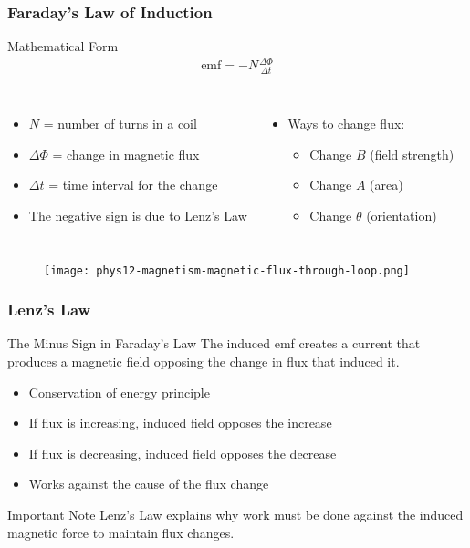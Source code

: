 \documentclass{beamer}
\begin{document}
\begin{frame}
\frametitle{Faraday's Law of Induction}
\begin{block}{Mathematical Form}
\begin{align}
\text{emf} = -N\frac{\Delta\Phi}{\Delta t}
\end{align}
\end{block}

\begin{columns}
\begin{itemize}
\item $N$ = number of turns in a coil
\item $\Delta\Phi$ = change in magnetic flux
\item $\Delta t$ = time interval for the change
\item The negative sign is due to Lenz's Law
\end{itemize}

\begin{itemize}
\item Ways to change flux:
\begin{itemize}
    \item Change $B$ (field strength)
    \item Change $A$ (area)
    \item Change $\theta$ (orientation)
\end{itemize}
\end{itemize}
\end{columns}
\end{frame}

\begin{frame}
\begin{figure}
    \centering
    \texttt{[image: phys12-magnetism-magnetic-flux-through-loop.png]}
\end{figure}
\end{frame}

\begin{frame}
\frametitle{Lenz's Law}
\begin{block}{The Minus Sign in Faraday's Law}
The induced emf creates a current that produces a magnetic field opposing the change in flux that induced it.
\end{block}

\begin{itemize}
\item Conservation of energy principle
\item If flux is increasing, induced field opposes the increase
\item If flux is decreasing, induced field opposes the decrease
\item Works against the cause of the flux change
\end{itemize}

\begin{alertblock}{Important Note}
Lenz's Law explains why work must be done against the induced magnetic force to maintain flux changes.
\end{alertblock}


\end{frame}
\end{document}
